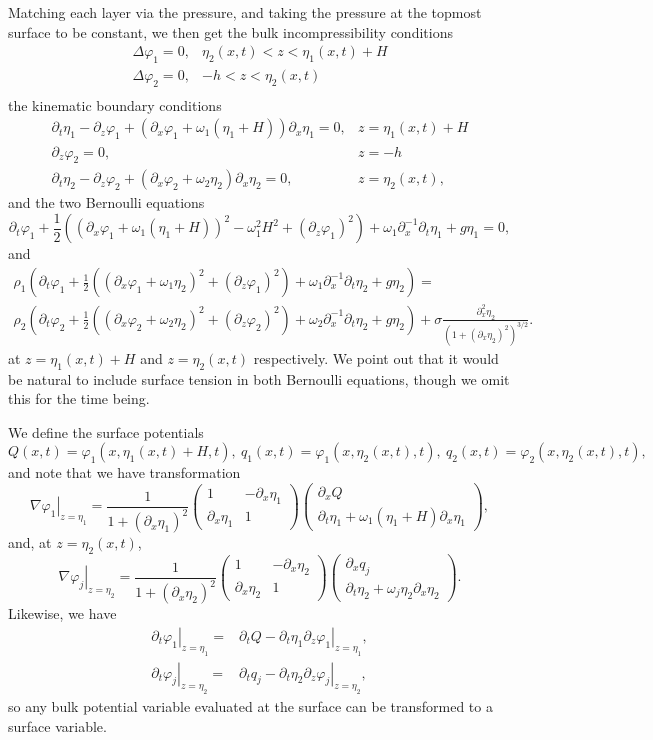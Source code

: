 \documentclass[a4paper,11pt]{article}
\newcommand{\ba}{\begin{array}}
\newcommand{\ea}{\end{array}}
\newcommand{\bp}{\begin{pmatrix}}
\newcommand{\ep}{\end{pmatrix}}
\newcommand{\p}{\partial}
\begin{document}
Matching each layer via the pressure, and taking the pressure at the topmost surface to be constant, we then get the bulk incompressibility conditions 
\[
\ba{lr}
\Delta \varphi_{1} = 0, & \eta_{2}(x,t) < z < \eta_{1}(x,t) +H\\ 
\Delta\varphi_{2} = 0, & -h<z<\eta_{2}(x,t)\\
\ea
\]
the kinematic boundary conditions
\[
\ba{rl}
\p_{t}\eta_{1} - \p_{z}\varphi_{1} + (\p_{x}\varphi_{1}+\omega_{1}(\eta_{1}+H))\p_{x}\eta_{1}=0,  & z = \eta_{1}(x,t)+H\\
\p_{z}\varphi_{2} = 0,  &z=-h\\
\p_{t}\eta_{2} - \p_{z}\varphi_{2} + (\p_{x}\varphi_{2}+\omega_{2}\eta_{2})\p_{x}\eta_{2}=0,  & z = \eta_{2}(x,t),
\ea
\]
and the two Bernoulli equations 
\[
\p_{t}\varphi_{1} + \frac{1}{2} \left( (\p_{x}\varphi_{1}+\omega_{1}(\eta_{1}+H))^{2}-\omega^{2}_{1}H^{2} + (\p_{z}\varphi_{1})^{2} \right) + \omega_{1}\p_{x}^{-1}\p_{t} \eta_{1} + g\eta_{1} = 0,
\]
and
\begin{align*}
\rho_{1}\left(\p_{t}\varphi_{1} + \frac{1}{2} \left( (\p_{x}\varphi_{1}+\omega_{1}\eta_{2})^{2} + (\p_{z}\varphi_{1})^{2} \right) + \omega_{1}\p_{x}^{-1}\p_{t} \eta_{2} + g\eta_{2} \right) = \\
\rho_{2}\left(\p_{t}\varphi_{2} + \frac{1}{2} \left( (\p_{x}\varphi_{2}+\omega_{2}\eta_{2})^{2} + (\p_{z}\varphi_{2})^{2} \right) + \omega_{2}\p_{x}^{-1}\p_{t} \eta_{2} + g\eta_{2} \right) + \sigma\frac{\p_{x}^{2}\eta_{2} }{(1+(\p_{x}\eta_{2})^{2})^{3/2}}.
\end{align*}
at $z=\eta_{1}(x,t)+H$ and $z=\eta_{2}(x,t)$ respectively.  We point out that it would be natural to include surface tension in both Bernoulli equations, though we omit this for the time being.  

We define the surface potentials 
\[
Q(x,t) = \varphi_{1}(x,\eta_{1}(x,t)+H,t), ~ q_{1}(x,t) = \varphi_{1}(x,\eta_{2}(x,t),t), ~ q_{2}(x,t) = \varphi_{2}(x,\eta_{2}(x,t),t), 
\]
and note that we have transformation
\[
\left.\nabla \varphi_{1}\right|_{z=\eta_{1}} = \frac{1}{1+(\p_{x}\eta_{1})^{2}}\bp 1 & -\p_{x}\eta_{1} \\ \p_{x}\eta_{1} & 1 \ep\bp \p_{x}Q \\ \p_{t}\eta_{1} + \omega_{1}(\eta_{1}+H)\p_{x}\eta_{1}\ep,
\]
and, at $z=\eta_{2}(x,t)$,
\[
\left.\nabla \varphi_{j}\right|_{z=\eta_{2}} = \frac{1}{1+(\p_{x}\eta_{2})^{2}}\bp 1 & -\p_{x}\eta_{2} \\ \p_{x}\eta_{2} & 1 \ep\bp \p_{x}q_{j} \\ \p_{t}\eta_{2} + \omega_{j}\eta_{2}\p_{x}\eta_{2}\ep.
\]
Likewise, we have 
\begin{align*}
\left.\p_{t}\varphi_{1}\right|_{z=\eta_{1}} = & \p_{t}Q - \p_{t}\eta_{1}\left.\p_{z}\varphi_{1}\right|_{z=\eta_{1}},\\
\left.\p_{t}\varphi_{j}\right|_{z=\eta_{2}} = & \p_{t}q_{j} - \p_{t}\eta_{2}\left.\p_{z}\varphi_{j}\right|_{z=\eta_{2}}, 
\end{align*}
so any bulk potential variable evaluated at the surface can be transformed to a surface variable.  
\end{document}

